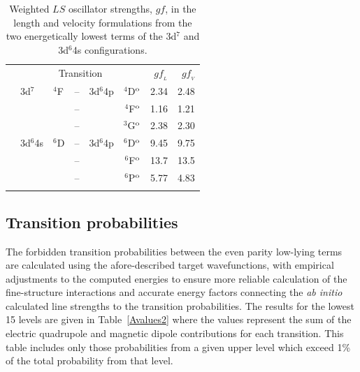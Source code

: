 \documentclass[useAMS,usenatbib]{mn2e}
\begin{document}
\begin{table}
\caption{Weighted $LS$ oscillator strengths, $gf$, in the length and velocity formulations from the
two energetically lowest terms of the 3d$^7$ and 3d$^6$4s configurations.}  \centering
\begin{tabular}{llllrr@{\hskip 1.5cm}rr}
\noalign{\hrule}
 & \multicolumn{5}{c}{\hspace{-1.5cm}Transition}  & $gf_{_L}$ & $gf_{_V}$ \\
\noalign{\hrule}
%
  & 3d$^7$    & $^4$F & -- & 3d$^6$4p & $^4$D$^{\rm o}$ & 2.34  &  2.48      \\
  &           &       & -- &         & $^4$F$^{\rm o}$ & 1.16 & 1.21 \\
  &           &       & -- &         & $^3$G$^{\rm o}$ & 2.38 & 2.30  \\
  & 3d$^6$4s  & $^6$D & -- & 3d$^6$4p & $^6$D$^{\rm o}$ & 9.45 & 9.75 \\
  &           &       & -- &         & $^6$F$^{\rm o}$ & 13.7 & 13.5 \\
  &           &       & -- &         & $^6$P$^{\rm o}$ & 5.77 & 4.83 \\
%
\noalign{\hrule}
\end{tabular}
\label{gflv}
\end{table}

\subsection{Transition probabilities}\label{Avalues}

The forbidden transition probabilities between the even parity low-lying terms are calculated using
the afore-described target wavefunctions, with empirical adjustments to the computed energies to
ensure more reliable calculation of the fine-structure interactions and accurate energy factors
connecting the {\it ab initio} calculated line strengths to the transition probabilities. The
results for the lowest 15 levels are given in Table~\ref{Avalues2} where the values represent the
sum of the electric quadrupole and magnetic dipole contributions for each transition. This table
includes only those probabilities from a given upper level which exceed 1\% of the total
probability from that level.
\end{document}
